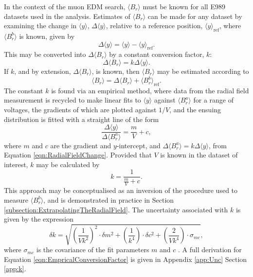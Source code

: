 In the context of the muon EDM search, $\langle B_{r} \rangle$ must be known for all E989 datasets used in the analysis. Estimates of $\langle B_{r} \rangle$ can be made for any dataset by examining the change in $\langle y \rangle$, $\Delta \langle y \rangle$, relative to a reference position, $ \langle y \rangle_{\text{ref}}$, where $\langle B_{r}^{b} \rangle$ is known, given by
%
\begin{equation}
  \Delta \langle y \rangle = \langle y \rangle - \langle y \rangle_{\text{ref}}.
  \label{eqn:DeltaYRef}
\end{equation}
%
This may be converted into $\Delta \langle B_{r} \rangle$ by a constant conversion factor, $k$:
%
\begin{equation}
  \Delta \langle B_{r} \rangle = k \Delta \langle y \rangle.
  \label{eqn:RadialFieldChange}
\end{equation}
%
If $k$, and by extension, $\Delta \langle B_{r} \rangle$, is known, then $\langle B_{r} \rangle$ may be estimated according to 
\begin{equation}
  \langle B_{r} \rangle = \Delta \langle B_{r} \rangle  + \langle B_{r}^{b} \rangle_{\text{ref}}.
  \label{eqn:AbsRadialField}
\end{equation}
%
The constant $k$ is found via an empirical method, where data from the radial field measurement is recycled to make linear fits to $\langle y \rangle$ against $\langle B_{r}^{a} \rangle$ for a range of voltages, the gradients of which are plotted against $1/V$, and the ensuing distribution is fitted with a straight line of the form
%
\begin{equation}
  \frac{\Delta \langle y \rangle}{\Delta \langle B_{r}^{a} \rangle} = \frac{m}{V} + c, 
\end{equation}
%
where $m$ and $c$ are the gradient and $y$-intercept, and $\Delta \langle B_{r}^{a} \rangle = k \Delta \langle y \rangle $, from Equation \ref{eqn:RadialFieldChange}. Provided that $V$ is known in the dataset of interest, $k$ may be calculated by 
%
\begin{equation}
  k = \frac{1}{\frac{m}{V} + c}.
  \label{eqn:EmpricalConversionFactor}
\end{equation}
%
This approach may be conceptualised as an inversion of the procedure used to measure $\langle B_{r}^{b} \rangle$, and is demonstrated in practice in Section \ref{subsection:ExtrapolatingTheRadialField}. The uncertainty associated with $k$ is given by the expression
%
\begin{equation}
  \delta k = \sqrt{ \left(\frac{1}{Vk^{2}}\right)^{2}\cdot \delta m ^{2} 
  + \left(\frac{1}{k^{4}}\right)\cdot\delta c^{2}
  + \left(\frac{2}{Vk^{4}}\right)\cdot \sigma_{mc} }, 
\end{equation}\label{eqn:EmpricalConversionFactorError}
%
where $\sigma_{mc}$ is the covariance of the fit parameters $m$ and $c$ \cite{Taylor}. A full derivation for Equation \ref{eqn:EmpricalConversionFactor} is given in Appendix \ref{app:Unc} Section \ref{app:k}. 

